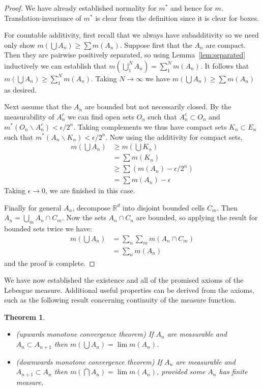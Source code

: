 \documentclass[11pt,oneside]{amsbook}
\renewcommand{\setminus}{\smallsetminus}
\newcommand{\RR}{{\mathbb R}}
\theoremstyle{definition}
\theoremstyle{plain}
\newtheorem{thm}{Theorem}[section]
\theoremstyle{definition}
\theoremstyle{remark}
\numberwithin{equation}{section}
\numberwithin{figure}{section}
\begin{document}
\begin{proof}
  We have already established normality for $m^*$ and hence for $m$. Translation-invariance of $m^*$ is clear from the definition since it is clear for boxes.

  For countable additivity, first recall that we always have subadditivity so we need only show $m(\bigcup A_n)\geq\sum m(A_n)$. Suppose first that the $A_n$ are compact. Then they are pairwise positively separated, so using Lemma~\ref{lem:separated} inductively we can establish that $m(\bigcup_1^N A_n)=\sum_1^N m(A_n)$. It follows that $m(\bigcup A_n)\geq\sum_1^Nm(A_n)$. Taking $N\to\infty$ we have $m(\bigcup A_n)\geq\sum m(A_n)$ as desired.

  Next assume that the $A_n$ are bounded but not necessarily closed. By the measurability of $A_n^c$ we can find open sets $O_n$ such that $A_n^c\subset O_n$ and $m^*(O_n\setminus A_n^c)<\epsilon/2^n$. Taking complements we thus have compact sets $K_n\subset E_n$ such that $m^*(A_n\setminus K_n)<\epsilon/2^n$. Now using the additivity for compact sets,
  \begin{align*}
    m(\bigcup A_n)&\geq m(\bigcup K_n)\\
                  &=\sum m(K_n)\\
                  &\geq\sum(m(A_n)-\epsilon/2^n)\\
                  &=\sum m(A_n)-\epsilon
  \end{align*}
  Taking $\epsilon\to0$, we are finished in this case.

  Finally for general $A_n$, decompose $\RR^d$ into disjoint bounded cells $C_m$. Then $A_n=\bigcup_m A_n\cap C_m$. Now the sets $A_n\cap C_n$ are bounded, so applying the result for bounded sets twice we have:
  \begin{align*}
    m(\bigcup A_n)&=\sum_n\sum_m m(A_n\cap C_m)\\
                  &=\sum_n m(A_n)
  \end{align*}
  and the proof is complete.
\end{proof}

We have now established the existence and all of the promised axioms of the Lebesgue measure. Additional useful properties can be derived from the axioms, such as the following result concerning continuity of the measure function.

\begin{thm}
  \label{thm:mct}
  \begin{itemize}
  \item (upwards monotone convergence theorem) If $A_n$ are measurable and $A_n\subset A_{n+1}$ then $m(\bigcup A_n)=\lim m(A_n)$.
  \item (downwards monotone convergence theorem) If $A_n$ are measurable and $A_{n+1}\subset A_n$ then $m(\bigcap A_n)=\lim m(A_n)$, provided some $A_n$ has finite measure.
  \end{itemize}
\end{thm}
\end{document}
